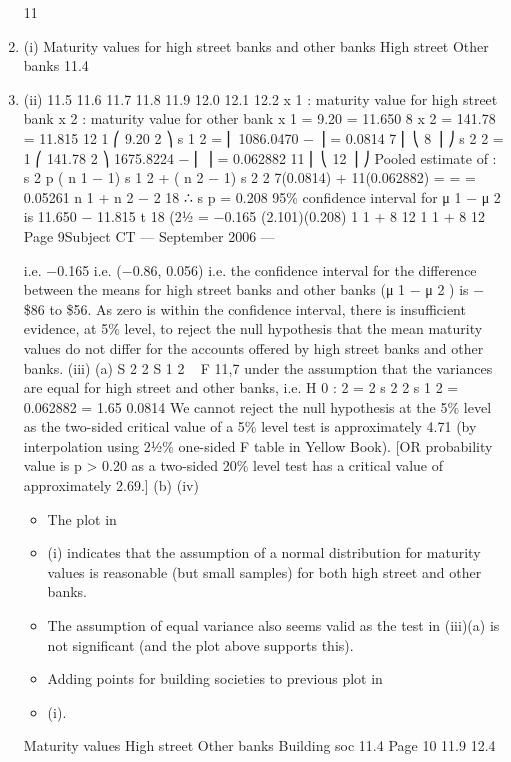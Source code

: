 \documentclass[a4paper,12pt]{article}
\begin{document}
\begin{enumerate}
\newpage
11
\item (i)
Maturity values for high street banks and other banks
High street
Other banks
11.4
\item (ii)
11.5
11.6
11.7
11.8
11.9
12.0
12.1
12.2
x 1 : maturity value for high street bank
x 2 : maturity value for other bank
x 1 = 9.20
= 11.650
8
x 2 = 141.78
= 11.815
12
1 ⎛
9.20 2 ⎞
s 1 2 = ⎜ 1086.0470 −
⎟ = 0.0814
7 ⎜ ⎝
8 ⎟ ⎠
s 2 2 =
1 ⎛
141.78 2 ⎞
1675.8224
−
⎜
⎟ = 0.062882
11 ⎜ ⎝
12 ⎟ ⎠
Pooled estimate of \sigma:
s 2 p
( n 1 − 1) s 1 2 + ( n 2 − 1) s 2 2 7(0.0814) + 11(0.062882)
=
=
= 0.05261
n 1 + n 2 − 2
18
∴ s p = 0.208
95\% confidence interval for μ 1 − μ 2 is
11.650 − 11.815 \pm t 18 (21⁄2%
= −0.165 \pm (2.101)(0.208)
1 1
+
8 12
1 1
+
8 12
Page 9Subject CT  — September 2006 — 

i.e. −0.165 
i.e. (−0.86, 0.056)
i.e. the confidence interval for the difference between the means for high street banks and other banks (μ 1 − μ 2 ) is −\$86 to \$56.
As zero is within the confidence interval, there is insufficient evidence, at 5\% level, to reject the null hypothesis that the mean maturity values do not differ
for the accounts offered by high street banks and other banks.
(iii)
(a)
S 2 2
S 1 2
~ F 11,7
under the assumption that the variances are equal for high street and
other banks,
i.e. H 0 :  2 =  2
s 2 2
s 1 2
=
0.062882
= 1.65
0.0814
We cannot reject the null hypothesis at the 5\% level as the two-sided critical value of a 5\% level test is approximately 4.71 (by interpolation using 21⁄2\% one-sided F table in Yellow Book).
[OR probability value is p > 0.20 as a two-sided 20\% level test has a critical value of approximately 2.69.]
(b)
(iv)
\begin{itemize}
\item The plot in \item (i) indicates that the assumption of a normal distribution for maturity values is reasonable (but small samples) for both high street
and other banks. 
\item The assumption of equal variance also seems valid as the test in (iii)(a) is not significant (and the plot above supports this).
\item Adding points for building societies to previous plot in \item (i).
\end{itemize}
Maturity values
High street
Other banks
Building soc
11.4
Page 10
11.9
12.4


\end{enumerate}
\end{document}
